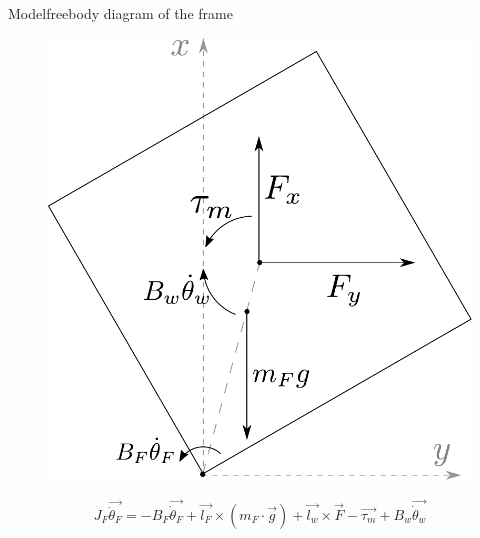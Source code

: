 \begin{frame}{Model}{freebody diagram of the frame}
	\begin{figure}[H]
		\includegraphics[scale=0.40]{Pictures/freeBodyFrame.pdf}
	\end{figure}
	\begin{displaymath}
	\si{J_F \vec{\ddot{\theta}_F} =}
	\si{-B_F \vec{\dot{\theta}_F} + \vec{l_F} \times (m_F\cdot \vec{g}) + \vec{l_w} \times \vec{F} - \vec{\tau_m} + B_w \vec{\dot{\theta}_w}}
	\end{displaymath}
	
	
\end{frame}

